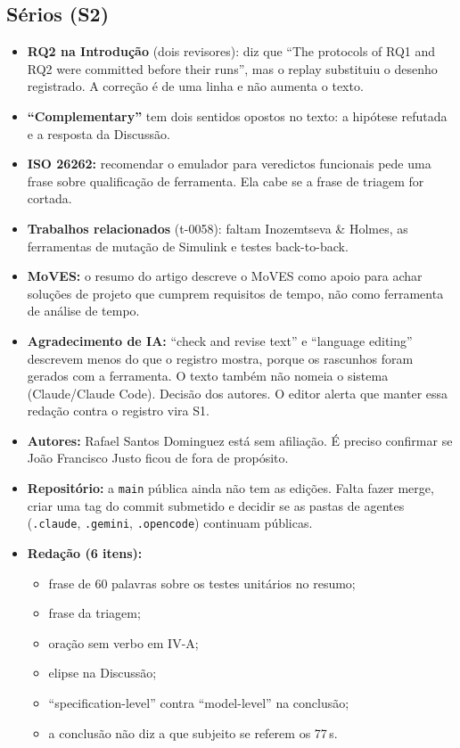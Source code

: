 \documentclass[10pt,a4paper]{article}
\begin{document}
\subsection{Sérios (S2)}
\begin{itemize}
\item \textbf{RQ2 na Introdução} (dois revisores): diz que ``The protocols of RQ1 and RQ2 were committed before their runs'', mas o replay substituiu o desenho registrado. A correção é de uma linha e não aumenta o texto.
\item \textbf{``Complementary''} tem dois sentidos opostos no texto: a hipótese refutada e a resposta da Discussão.
\item \textbf{ISO 26262:} recomendar o emulador para veredictos funcionais pede uma frase sobre qualificação de ferramenta. Ela cabe se a frase de triagem for cortada.
\item \textbf{Trabalhos relacionados} (t-0058): faltam Inozemtseva \& Holmes, as ferramentas de mutação de Simulink e testes back-to-back.
\item \textbf{MoVES:} o resumo do artigo descreve o MoVES como apoio para achar soluções de projeto que cumprem requisitos de tempo, não como ferramenta de análise de tempo.
\item \textbf{Agradecimento de IA:} ``check and revise text'' e ``language editing'' descrevem menos do que o registro mostra, porque os rascunhos foram gerados com a ferramenta. O texto também não nomeia o sistema (Claude/Claude Code). Decisão dos autores. O editor alerta que manter essa redação contra o registro vira S1.
\item \textbf{Autores:} Rafael Santos Dominguez está sem afiliação. É preciso confirmar se João Francisco Justo ficou de fora de propósito.
\item \textbf{Repositório:} a \texttt{main} pública ainda não tem as edições. Falta fazer merge, criar uma tag do commit submetido e decidir se as pastas de agentes (\texttt{.claude}, \texttt{.gemini}, \texttt{.opencode}) continuam públicas.
\item \textbf{Redação (6 itens):}
  \begin{itemize}
  \item frase de 60 palavras sobre os testes unitários no resumo;
  \item frase da triagem;
  \item oração sem verbo em IV-A;
  \item elipse na Discussão;
  \item ``specification-level'' contra ``model-level'' na conclusão;
  \item a conclusão não diz a que subjeito se referem os 77\,s.
  \end{itemize}
\end{itemize}
\end{document}
